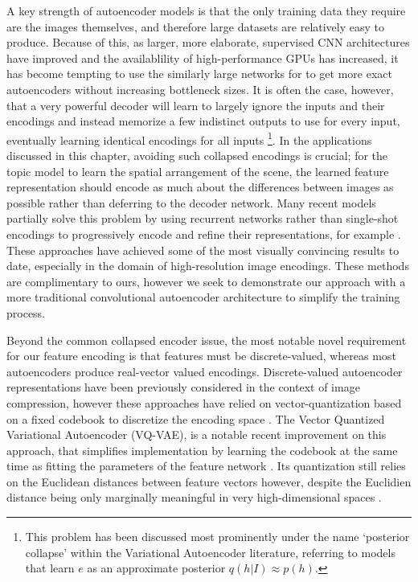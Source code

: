 A key strength of autoencoder models is that the only training data they require are the images themselves, and therefore large datasets are relatively easy to produce. Because of this, as larger, more elaborate, supervised CNN architectures have improved and the availablility of high-performance GPUs has increased, it has become tempting to use the similarly large networks for to get more exact autoencoders without increasing bottleneck sizes. It is often the case, however, that a very powerful decoder will learn to largely ignore the inputs and their encodings and instead memorize a few indistinct outputs to use for every input, eventually learning identical encodings for all inputs \citep{vincent2010stacked,Chen2016}\footnote{This problem has been discussed most prominently under the name `posterior collapse' within the Variational Autoencoder literature, referring to models that learn $e$ as an approximate posterior $q(h | I) \approx p(h)$.}. In the applications discussed in this chapter, avoiding such collapsed encodings is crucial; for the topic model to learn the spatial arrangement of the scene, the learned feature representation should encode as much about the differences between images as possible rather than deferring to the decoder network. Many recent models partially solve this problem by using recurrent networks rather than single-shot encodings to progressively encode and refine their representations, for example \citep{OordPixelCNN,Chen2016,Gregor2016}. These approaches have achieved some of the most visually convincing results to date, especially in the domain of high-resolution image encodings. These methods are complimentary to ours, however we seek to demonstrate our approach with a more traditional convolutional autoencoder architecture to simplify the training process.

Beyond the common collapsed encoder issue, the most notable novel requirement for our feature encoding is that features must be discrete-valued, whereas most autoencoders produce real-vector valued encodings. Discrete-valued autoencoder representations have been previously considered in the context of image compression, however these approaches have relied on vector-quantization based on a fixed codebook to discretize the encoding space \citep{AgustssonSoftToHardVQ}. The Vector Quantized Variational Autoencoder (VQ-VAE), is a notable recent improvement on this approach, that simplifies implementation by learning the codebook at the same time as fitting the parameters of the feature network \citep{vqvae2017}. Its quantization still relies on the Euclidean distances between feature vectors however, despite the Euclidien distance being only marginally meaningful in very high-dimensional spaces \citep{aggarwal2001metrics}.

